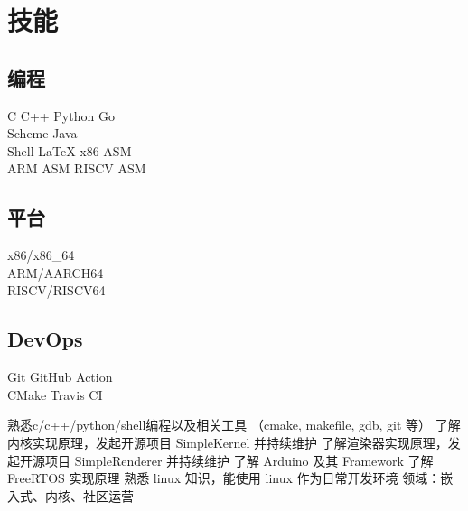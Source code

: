 \documentclass[]{deedy-resume-openfont}
\begin{document}
\begin{minipage}[t]{0.25\textwidth}

\section{技能}
\subsection{编程}
C \textbullet{} C++ \textbullet{} Python \textbullet{} Go \\
Scheme \textbullet{} Java \\
Shell \textbullet{} \LaTeX \textbullet{} x86 ASM \\
ARM ASM \textbullet{} RISCV ASM \\
\sectionsep

\subsection{平台}
x86/x86\_64 \\
ARM/AARCH64 \\
RISCV/RISCV64 \\
\sectionsep

\subsection{DevOps}
Git \textbullet{} GitHub Action \\
CMake \textbullet{} Travis CI

熟悉c/c++/python/shell编程以及相关工具 （cmake, makefile, gdb, git 等）
了解内核实现原理，发起开源项目 SimpleKernel 并持续维护
了解渲染器实现原理，发起开源项目 SimpleRenderer 并持续维护
了解 Arduino 及其 Framework
了解 FreeRTOS 实现原理
熟悉 linux 知识，能使用 linux 作为日常开发环境
领域：嵌入式、内核、社区运营

%
%

\end{minipage} 
\hfill
\end{document}
